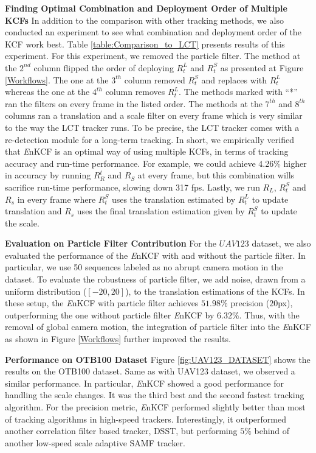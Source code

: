 \documentclass[10pt,twocolumn,letterpaper]{article}
\begin{document}
\textbf{Finding Optimal Combination and Deployment Order of Multiple
  KCFs} In addition to the comparison with other tracking methods, we
also conducted an experiment to see what combination and deployment
order of the KCF work best. Table \ref{table:Comparison_to_LCT}
presents results of this experiment. For this experiment, we removed
the particle filter. The method at the $2^{nd}$ column flipped the
order of deploying $R_{t}^{L}$ and $R_{t}^{S}$ as presented at Figure
\ref{Workflows}. The one at the $3^{th}$ column removed $R_{t}^{S}$
and replaces with $R_{t}^{L}$ whereas the one at the $4^{th}$ column
removes $R_{t}^{L}$. The methods marked with ``*'' ran the filters on
every frame in the listed order. The methods at the $7^{th}$ and
$8^{th}$ columns ran a translation and a scale filter on every frame
which is very similar to the way the LCT tracker \cite{ma2015long}
runs. To be precise, the LCT tracker comes with a re-detection module
for a long-term tracking. In short, we empirically verified that
\textit{E}nKCF is an optimal way of using multiple KCFs, in terms of
tracking accuracy and run-time performance. For example, we could
achieve 4.26\% higher in accuracy by running $R_{R}^{t}$ and $R_{S}$
at every frame, but this combination wills sacrifice run-time
performance, slowing down 317 fps. Lastly, we run $R_{L}$, $R_{t}^{S}$
and $R_{s}$ in every frame where $R_{t}^{S}$ uses the translation
estimated by $R_{t}^{L}$ to update translation and $R_{s}$ uses the
final translation estimation given by $R_{t}^{S}$ to update the scale.

\textbf{Evaluation on Particle Filter Contribution} For the $UAV123$
dataset, we also evaluated the performance of the {\it E}nKCF with and
without the particle filter. In particular, we use 50 sequences
labeled as no abrupt camera motion in the dataset. To evaluate the
robustness of particle filter, we add noise, drawn from a uniform
distribution ($[-20,20]$), to the translation estimations of the
KCFs. In these setup, the {\it E}nKCF with particle filter achieves
$51.98\%$ precision ($20$px), outperforming the one without particle
filter {\it E}nKCF by $6.32\%$. Thus, with the removal of global
camera motion, the integration of particle filter into the {\it E}nKCF
as shown in Figure \ref{Workflows} further improved the results.

\textbf{Performance on OTB100 Dataset} Figure \ref{fig:UAV123_DATASET}
shows the results on the OTB100 dataset. Same as with UAV123 dataset,
we observed a similar performance. In particular, {\it E}nKCF showed a
good performance for handling the scale changes. It was the third best
and the second fastest tracking algorithm. For the precision metric,
{\it E}nKCF performed slightly better than most of tracking algorithms
in high-speed trackers. Interestingly, it outperformed another
correlation filter based tracker, DSST, but performing $5\%$ behind of
another low-speed scale adaptive SAMF tracker.
\end{document}

